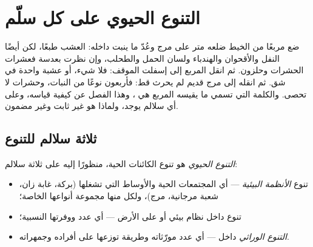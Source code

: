 \chapter{التنوع الحيوي على كل سلّم}\label{ch:g10:biodiversity-scales}

ضع مربعًا من الخيط ضلعه متر على مرج وعُدّ ما ينبت داخله: العشب طبعًا،
لكن أيضًا النفل والأقحوان والهندباء ولسان الحمل والطحلب، وإن نظرت
بعدسة فعشرات الحشرات وحلزون. ثم انقل المربع إلى إسفلت الموقف: فلا شيء،
أو عشبة واحدة في شق. ثم انقله إلى مرج قديم لم يحرث قط: فأربعون نوعًا
من النبات، وحشرات لا تحصى. والكلمة التي تسمي ما يقيسه المربع هي
\emph{}، وهذا الفصل عن كيفية قياسه، وعلى أي سلالم يوجد،
ولماذا هو غير ثابت وغير مضمون.

\section{ثلاثة سلالم للتنوع}

\begin{definition}\label{def:g10:biodiversity-scales:biodiversity}
\emph{التنوع الحيوي} هو تنوع الكائنات الحية، منظورًا
إليه على ثلاثة سلالم:
\begin{itemize}
  \item تنوع \emph{الأنظمة البيئية} --- أي المجتمعات
        الحية والأوساط التي تشغلها (بركة، غابة زان، شعبة مرجانية،
        مرج)، ولكل منها مجموعة أنواعها الخاصة؛
  \item تنوع  داخل نظام بيئي أو على الأرض --- أي عدد 
        ووفرتها النسبية؛
  \item \emph{التنوع الوراثي} داخل  --- أي عدد
         مورّثاته وطريقة توزعها على أفراده وجمهراته.
\end{itemize}
\end{definition}


